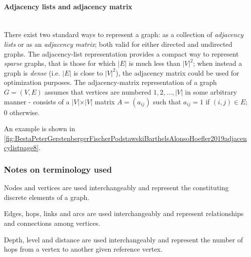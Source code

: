 \paragraph{Adjacency lists and adjacency matrix}\mbox{}\\\indent
	There exist two standard ways to represent a graph: as a collection of \textit{adjacency lists} or as an \textit{adjacency matrix};
	both valid for either directed and undirected graphs.
	The adjacency-list representation provides a compact way to represent \textit{sparse} graphs, that is those for which $ \vert E \vert $ is much less than $ \vert V \vert ^2 $;
	when instead a graph is \textit{dense} (i.e. $ \vert E \vert $ is close to $ \vert V \vert ^2 $), the adjacency matrix could be used for optimization purposes.
	The adjacency-matrix representation of a graph $ G = \left( V, E \right) $ assumes that vertices are numbered $1, 2, \ldots, \vert V \vert $ in some arbitrary manner - consists of a $ \vert V \vert \times \vert V \vert $ matrix $ A = \left( a_{ij} \right) $ such that $ a_{ij} = 1 $ if $ \left(i, j \right) \in E $; $ 0 $ otherwise. 
		
	An example is shown in \hyperref[fig:BestaPeterGerstenbergerFischerPodstawskiBarthelsAlonsoHoefler2019adjacencylistpage8]{\autoref{fig:BestaPeterGerstenbergerFischerPodstawskiBarthelsAlonsoHoefler2019adjacencylistpage8}}.
\par
\subsubsection{Notes on terminology used}\label{subsubsection:Notesonterminology}
\begin{remark}[on nodes]\label{remark:onnodes}
		Nodes and vertices are used interchangeably and represent the constituting discrete elements of a graph.
\end{remark}
	
\begin{remark}[on edges]\label{remark:onedges}
	Edges, hops, links and arcs are used interchangeably and represent relationships and connections among vertices.
\end{remark}
	
\begin{remark}\label{remark:ondepthandnumberofhops}
	Depth, level and distance are used interchangeably and represent the number of hops from a vertex to another given reference vertex.
\end{remark}
	
